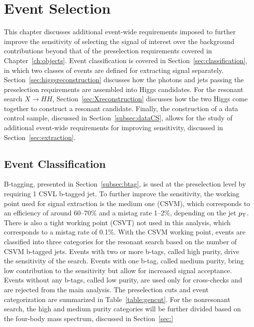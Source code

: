 \chapter{Event Selection\label{ch:selection}}

This chapter discusses additional event-wide requirements imposed to further
improve the sensitivity of selecting the signal of interest over the background contributions
beyond that of the preselection requirements covered in Chapter~\ref{ch:objects}.
Event classification is covered in Section~\ref{sec:classification}, in which two classes of
events are defined for extracting signal separately.
Section~\ref{sec:higgsreconstruction} discusses how the photons and jets passing the preselection
requirements are assembled into Higgs candidates. For the resonant search $X\rightarrow HH$,
Section~\ref{sec:Xreconstruction} discusses how the two Higgs come together to construct a resonant
candidate. Finally, the construction of a data control
sample, discussed in Section~\ref{subsec:dataCS}, allows for the study of additional event-wide
requirements for improving sensitivity, discussed in Section~\ref{sec:extraction}.

\section{Event Classification\label{sec:classification}}

B-tagging, presented in Section~\ref{subsec:btag}, is used at the preselection level by
requiring 1 CSVL b-tagged jet. To further improve the sensitivity, the working point used for
signal extraction is the medium one (CSVM), which corresponds to an efficiency of around 60--70\%
and a mistag rate 1--2\%, depending on the jet $p_{\rm T}$.
There is also a tight working point (CSVT) not used in this analysis,
which corresponds to a mistag rate of 0.1\%.
With the CSVM working point, events are classified into three categories for the resonant search
based on the number of CSVM b-tagged jets. Events with two or more b-tags, called high purity,
drive the sensitivity of the search. Events with one b-tag, called medium purity,
bring low contribution to the sensitivity
but allow for increased signal acceptance. Events without any b-tags,
called low purity, are used only for cross-checks and are rejected from the main analysis.
The preselection cuts and event categorization
are summarized in Table~\ref{table:gencut}.
For the nonresonant search, the high and medium purity categories will be further divided based
on the four-body mass spectrum, discussed in Section~\ref{sec:}

